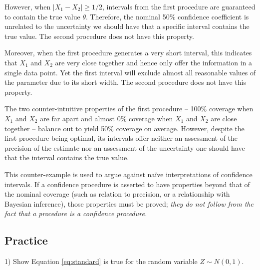 \documentclass[11pt,a4paper]{article}
\begin{document}
However, when \(|X_1 - X_2| \geq 1/2\),
intervals from the first procedure are guaranteed to contain the true value \(\theta\).
Therefore, the nominal 50\% confidence coefficient is unrelated to the uncertainty we should have 
that a specific interval contains the true value. 
The second procedure does not have this property.

Moreover, when the first procedure generates a very short interval, 
this indicates that \(X_{1}\) and \(X_{2}\) are very close together and 
hence only offer the information in a single data point. 
Yet the first interval will exclude almost all reasonable values of the parameter due to its short width. 
The second procedure does not have this property.

The two counter-intuitive properties of the first procedure 
-- 100\% coverage when \(X_{1}\) and \(X_{2}\) are far apart 
and almost 0\% coverage when \(X_{1}\) and \(X_{2}\) are close together 
-- balance out to yield 50\% coverage on average. 
However,
despite the first procedure being optimal, 
its intervals offer neither an assessment of the precision of the estimate 
nor an assessment of the uncertainty one should have that the interval contains the true value.

This counter-example is used to argue against naïve interpretations of confidence intervals. 
If a confidence procedure is asserted to have properties beyond that of the nominal coverage (such as relation to precision, 
or a relationship with Bayesian inference), 
those properties must be proved; 
\emph{they do not follow from the fact that a procedure is a confidence procedure.}

\newpage
\subsection{Practice}

1) Show Equation \ref{eq:standard} is true for the random variable \(Z \sim N(0,1)\).
\end{document}
